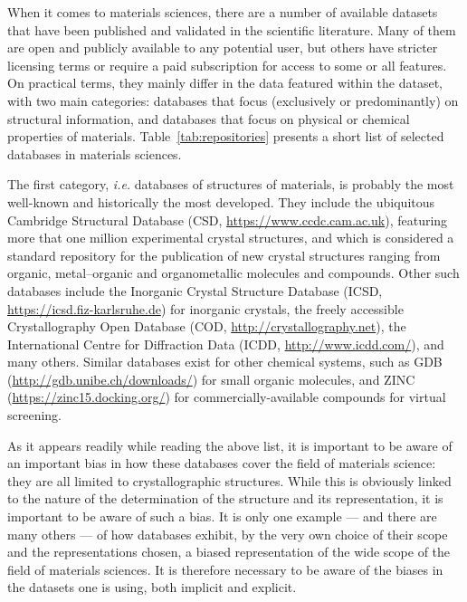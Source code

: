\documentclass[aip,apm,amsmath,amssymb,reprint]{revtex4-2}
\begin{document}
When it comes to materials sciences, there are a number of available datasets that have been published and validated in the scientific literature. Many of them are open and publicly available to any potential user, but others have stricter licensing terms or require a paid subscription for access to some or all features. On practical terms, they mainly differ in the data featured within the dataset, with two main categories: databases that focus (exclusively or predominantly) on structural information, and databases that focus on physical or chemical properties of materials. Table~\ref{tab:repositories} presents a short list of selected databases in materials sciences.

The first category, \emph{i.e.} databases of structures of materials, is probably the most well-known and historically the most developed. They include the ubiquitous Cambridge Structural Database (CSD, \url{https://www.ccdc.cam.ac.uk}), featuring more that one million experimental crystal structures, and which is considered a standard repository for the publication of new crystal structures ranging from organic, metal--organic and organometallic molecules and compounds. Other such databases include the Inorganic Crystal Structure Database (ICSD, \url{https://icsd.fiz-karlsruhe.de}) for inorganic crystals, the freely accessible Crystallography Open Database\cite{Grazulis2009} (COD, \url{http://crystallography.net}), the International Centre for Diffraction Data (ICDD, \url{http://www.icdd.com/}), and many others. Similar databases exist for other chemical systems, such as GDB\cite{Fink2007} (\url{http://gdb.unibe.ch/downloads/}) for small organic molecules, and ZINC\cite{Sterling2015} (\url{https://zinc15.docking.org/}) for commercially-available compounds for virtual screening.

As it appears readily while reading the above list, it is important to be aware of an important bias in how these databases cover the field of materials science: they are all limited to crystallographic structures. While this is obviously linked to the nature of the determination of the structure and its representation, it is important to be aware of such a bias. It is only one example --- and there are many others --- of how databases exhibit, by the very own choice of their scope and the representations chosen, a biased representation of the wide scope of the field of materials sciences. It is therefore necessary to be aware of the biases in the datasets one is using, both implicit and explicit.
\end{document}
